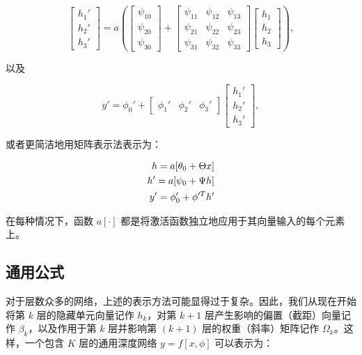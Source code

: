 \documentclass[lang=cn,newtx,10pt,scheme=chinese]{elegantbook}
\begin{document}
\begin{equation}
\begin{bmatrix}
	h_1' \\
	h_2' \\
	h_3'
\end{bmatrix}
= a
\left(
\begin{bmatrix}
	\psi_{10} \\
	\psi_{20} \\
	\psi_{30}
\end{bmatrix}
+
\begin{bmatrix}
	\psi_{11} & \psi_{12} & \psi_{13} \\
	\psi_{21} & \psi_{22} & \psi_{23} \\
	\psi_{31} & \psi_{32} & \psi_{33}
\end{bmatrix}
\begin{bmatrix}
	h_1 \\
	h_2 \\
	h_3
\end{bmatrix}
\right),
\end{equation}

以及

\begin{equation}
y' = \phi_0' + 
\begin{bmatrix}
	\phi_1' & \phi_2' & \phi_3'
\end{bmatrix}
\begin{bmatrix}
	h_1' \\
	h_2' \\
	h_3' 
\end{bmatrix},
\end{equation}

或者更简洁地用矩阵表示法表示为：


\begin{align}
	h = a[\theta_0 + \Theta x] \notag \\
	h' = a[\psi_0 + \Psi h] \notag \\
	y' = \phi_0' + \phi'^T h' 
\end{align} 


在每种情况下，函数 \(a[\cdot]\) 都是将激活函数独立地应用于其向量输入的每个元素上。

\subsection{通用公式}
对于层数众多的网络，上述的表示方法可能显得过于复杂。因此，我们从现在开始将第 \(k\) 层的隐藏单元向量记作 \(h_k\)，对第 \(k+1\) 层产生影响的偏置（截距）向量记作 \(\beta_k\)，以及作用于第 \(k\) 层并影响第 \((k+1)\) 层的权重（斜率）矩阵记作 \(\Omega_k\)。这样，一个包含 \(K\) 层的通用深度网络 \(y = f[x, \phi]\) 可以表示为：
\end{document}
